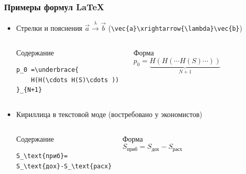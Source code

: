 \begin{frame}[fragile]
\frametitle{Примеры формул \LaTeX}
\begin{itemize}

\item Стрелки и пояснения $\vec{a}\xrightarrow{\lambda}\vec{b}$ (\verb"\vec{a}\xrightarrow{\lambda}\vec{b}")
    \begin{columns}
            \begin{block}{Содержание}
\begin{verbatim}
p_0 =\underbrace{
    H(H(\cdots H(S)\cdots )) 
}_{N+1}
\end{verbatim}
            \end{block}
        
            \begin{block}{Форма}
\[p_0 =\underbrace{
    H(H(\cdots H(S)\cdots )) 
}_{N+1}
\]
            \end{block}
    \end{columns}
    
\item Кириллица в текстовой моде (востребовано у экономистов)
    \begin{columns}
            \begin{block}{Содержание}
\begin{verbatim}
S_\text{приб}=
S_\text{дох}-S_\text{расх}
\end{verbatim}
            \end{block}
        
            \begin{block}{Форма}
\[S_\text{приб}=S_\text{дох}-S_\text{расх}\]
            \end{block}
    \end{columns}
   
\end{itemize}
\end{frame}


